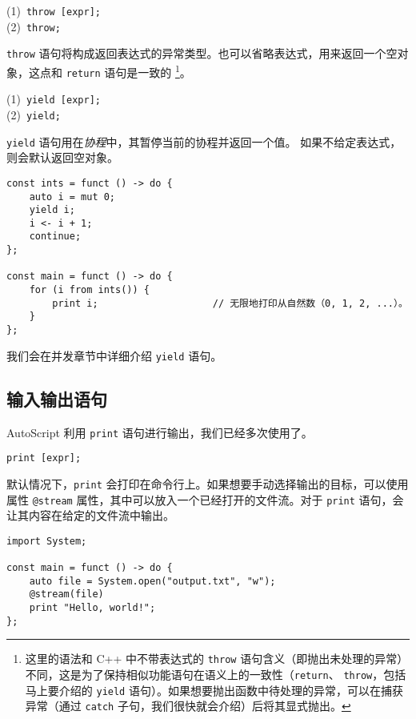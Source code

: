 \begin{grammar} \label{grm:throw-statement}
    (1)\ \lstinline!throw [expr];! \\
    (2)\ \lstinline!throw;!
\end{grammar}

\lstinline!throw! 语句将构成返回表达式的异常类型。也可以省略表达式，用来返回一个空对象，这点和 \lstinline!return! 语句是一致的 \footnote{这里的语法和 C++ 中不带表达式的 \lstinline!throw! 语句含义（即抛出未处理的异常）不同，这是为了保持相似功能语句在语义上的一致性（\lstinline!return!、 \lstinline!throw!，包括马上要介绍的 \lstinline!yield! 语句）。如果想要抛出函数中待处理的异常，可以在捕获异常（通过 \lstinline!catch! 子句，我们很快就会介绍）后将其显式抛出。}。

\begin{grammar} \label{grm:yield-statement}
    (1)\ \lstinline!yield [expr];! \\
    (2)\ \lstinline!yield;!
\end{grammar}

\lstinline!yield! 语句用在\emph{协程}中，其暂停当前的协程并返回一个值。	如果不给定表达式，则会默认返回空对象。

\begin{lstlisting}
const ints = funct () -> do {
	auto i = mut 0;
	yield i;
	i <- i + 1;
	continue;
};

const main = funct () -> do {
	for (i from ints()) {
		print i;					// 无限地打印从自然数（0, 1, 2, ...）。
	}
};
\end{lstlisting}

我们会在并发章节中详细介绍 \lstinline!yield! 语句。

\subsection{输入输出语句}

AutoScript 利用 \lstinline!print! 语句进行输出，我们已经多次使用了。

\begin{grammar} \label{grm:print-statement}
    \lstinline!print [expr];!
\end{grammar}

默认情况下，\lstinline!print! 会打印在命令行上。如果想要手动选择输出的目标，可以使用属性 \lstinline!@stream! 属性，其中可以放入一个已经打开的文件流。对于 \lstinline!print! 语句，会让其内容在给定的文件流中输出。

\begin{lstlisting}
import System;

const main = funct () -> do {
    auto file = System.open("output.txt", "w");
    @stream(file)
    print "Hello, world!";
};
\end{lstlisting}

